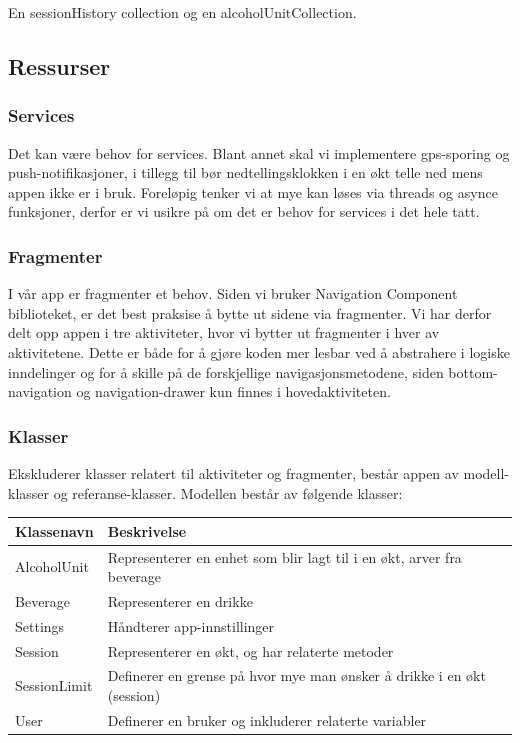 En sessionHistory collection og en alcoholUnitCollection.

\subsection{Ressurser}
\subsubsection{Services}
Det kan være behov for services. Blant annet skal vi implementere gps-sporing og push-notifikasjoner, i tillegg til bør nedtellingsklokken i en økt telle ned mens appen ikke er i bruk. Foreløpig tenker vi at mye kan løses via threads og asynce funksjoner, derfor er vi usikre på om det er behov for services i det hele tatt.

\subsubsection{Fragmenter}
I vår app er fragmenter et behov. Siden vi bruker Navigation Component biblioteket, er det best praksise å bytte ut sidene via fragmenter. Vi har derfor delt opp appen i tre aktiviteter, hvor vi bytter ut fragmenter i hver av aktivitetene. Dette er både for å gjøre koden mer lesbar ved å abstrahere i logiske inndelinger og for å skille på de forskjellige navigasjonsmetodene, siden bottom-navigation og navigation-drawer kun finnes i hovedaktiviteten.

\subsubsection{Klasser}
Ekskluderer klasser relatert til aktiviteter og fragmenter, består appen av modell-klasser og referanse-klasser. Modellen består av følgende klasser:

\begin{tabular}{ | m{4cm} | m{12cm} | } 
    \hline
    \textbf{Klassenavn} & \textbf{Beskrivelse} \\
    \hline
    AlcoholUnit &
    Representerer en enhet som blir lagt til i en økt, arver fra beverage \\
    \hline
    Beverage &
    Representerer en drikke \\
    \hline
    Settings &
    Håndterer app-innstillinger \\
    \hline
    Session &
    Representerer en økt, og har relaterte metoder \\
    \hline
    SessionLimit &
    Definerer en grense på hvor mye man ønsker å drikke i en økt (session) \\
    \hline
    User &
    Definerer en bruker og inkluderer relaterte variabler \\
    \hline
\end{tabular}

